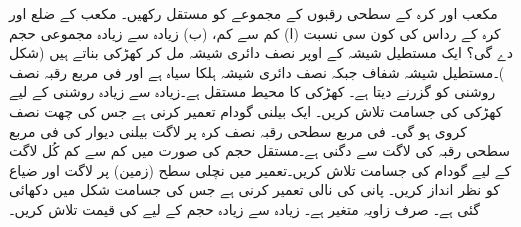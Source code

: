 مکعب اور کرہ کے سطحی رقبوں کے مجموعے کو مستقل رکھیں۔ مکعب کے ضلع اور کرہ کے رداس کی کون سی نسبت (ا) کم سے کم، (ب) زیادہ سے زیادہ مجموعی حجم دے گی؟
ایک مستطیل شیشہ کے اوپر نصف دائری شیشہ مل کر کھڑکی بناتے ہیں (شکل )۔مستطیل شیشہ شفاف   جبکہ نصف دائری شیشہ ہلکا سیاہ ہے اور فی مربع رقبہ نصف روشنی کو گزرنے دیتا ہے۔ کھڑکی کا محیط مستقل ہے۔زیادہ سے زیادہ روشنی کے لیے کھڑکی کی جسامت تلاش کریں۔ 
ایک بیلنی گودام  تعمیر کرنی ہے جس کی چھت نصف کروی ہو گی۔ فی مربع سطحی رقبہ نصف کرہ پر لاگت بیلنی دیوار کی فی مربع سطحی رقبہ کی لاگت سے دگنی ہے۔مستقل حجم کی صورت میں کم سے کم کُل لاگت کے لیے گودام کی جسامت تلاش کریں۔تعمیر میں نچلی سطح (زمین) پر لاگت اور ضیاع کو نظر انداز کریں۔ 
 پانی کی نالی تعمیر کرنی ہے جس کی جسامت شکل  میں دکھائی گئی ہے۔ صرف زاویہ  متغیر ہے۔ زیادہ سے زیادہ حجم کے لیے  کی قیمت تلاش کریں۔
